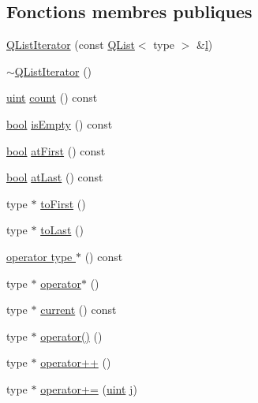 \subsection*{Fonctions membres publiques}
\begin{DoxyCompactItemize}
\item 
\hyperlink{class_q_list_iterator_a826bd77b3505d0e9bc43971660b598e3}{Q\+List\+Iterator} (const \hyperlink{class_q_list}{Q\+List}$<$ type $>$ \&\hyperlink{060__command__switch_8tcl_aff56f84b49947b84b2a304f51cf8e678}{l})
\item 
\hyperlink{class_q_list_iterator_ac07d78079a55aa0c840cd10cd7ebb02e}{$\sim$\+Q\+List\+Iterator} ()
\item 
\hyperlink{qglobal_8h_a4d3943ddea65db7163a58e6c7e8df95a}{uint} \hyperlink{class_q_list_iterator_a674cbc34981bf9144c03f592570bc476}{count} () const 
\item 
\hyperlink{qglobal_8h_a1062901a7428fdd9c7f180f5e01ea056}{bool} \hyperlink{class_q_list_iterator_aae843254324649763d4afe8983ba9159}{is\+Empty} () const 
\item 
\hyperlink{qglobal_8h_a1062901a7428fdd9c7f180f5e01ea056}{bool} \hyperlink{class_q_list_iterator_a3c5a9d52430c60bd864e0991905b8d67}{at\+First} () const 
\item 
\hyperlink{qglobal_8h_a1062901a7428fdd9c7f180f5e01ea056}{bool} \hyperlink{class_q_list_iterator_a218f0156f317f322c17f0a882a94226c}{at\+Last} () const 
\item 
type $\ast$ \hyperlink{class_q_list_iterator_a2c526dad2cc4158567c56d18329cb6f5}{to\+First} ()
\item 
type $\ast$ \hyperlink{class_q_list_iterator_a1470808c16e884e0a5c8a184be6f100a}{to\+Last} ()
\item 
\hyperlink{class_q_list_iterator_a55697850c24096868c4d0d795618fcbf}{operator type $\ast$} () const 
\item 
type $\ast$ \hyperlink{class_q_list_iterator_a8511ae825b3b3373b7c678a5ec53f826}{operator$\ast$} ()
\item 
type $\ast$ \hyperlink{class_q_list_iterator_ad76da8e83d30870903d8a1d6f37017e8}{current} () const 
\item 
type $\ast$ \hyperlink{class_q_list_iterator_a89144a3f0d9c0f4a7eb88a138475dde5}{operator()} ()
\item 
type $\ast$ \hyperlink{class_q_list_iterator_a680b934903a3b9272df2de5800721bfa}{operator++} ()
\item 
type $\ast$ \hyperlink{class_q_list_iterator_a1a07477e5b39b48e6be114008b724095}{operator+=} (\hyperlink{qglobal_8h_a4d3943ddea65db7163a58e6c7e8df95a}{uint} \hyperlink{060__command__switch_8tcl_a2aaa92757686acea102cba3475f0c13b}{j})

\end{DoxyCompactItemize}
